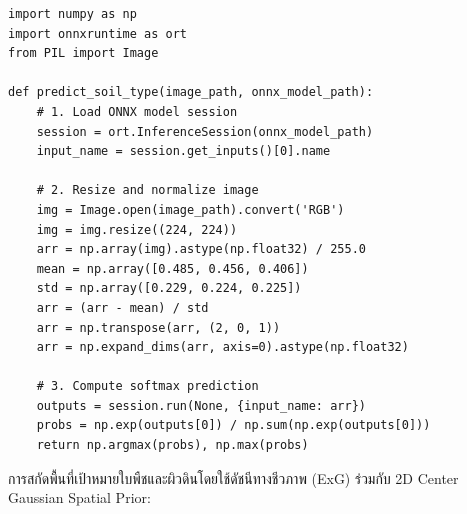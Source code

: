 \begin{tcolorbox}[title=\textbf{สคริปต์การอนุมานผลด้วย ONNX Runtime}]
\fontsize{8.5}{11}\selectfont
\begin{verbatim}
import numpy as np
import onnxruntime as ort
from PIL import Image

def predict_soil_type(image_path, onnx_model_path):
    # 1. Load ONNX model session
    session = ort.InferenceSession(onnx_model_path)
    input_name = session.get_inputs()[0].name
    
    # 2. Resize and normalize image
    img = Image.open(image_path).convert('RGB')
    img = img.resize((224, 224))
    arr = np.array(img).astype(np.float32) / 255.0
    mean = np.array([0.485, 0.456, 0.406])
    std = np.array([0.229, 0.224, 0.225])
    arr = (arr - mean) / std
    arr = np.transpose(arr, (2, 0, 1))
    arr = np.expand_dims(arr, axis=0).astype(np.float32)
    
    # 3. Compute softmax prediction
    outputs = session.run(None, {input_name: arr})
    probs = np.exp(outputs[0]) / np.sum(np.exp(outputs[0]))
    return np.argmax(probs), np.max(probs)
\end{verbatim}
\end{tcolorbox}

\label{sec:code_precision_roi}

การสกัดพื้นที่เป้าหมายใบพืชและผิวดินโดยใช้ดัชนีทางชีวภาพ (ExG) ร่วมกับ 2D Center Gaussian Spatial Prior:

